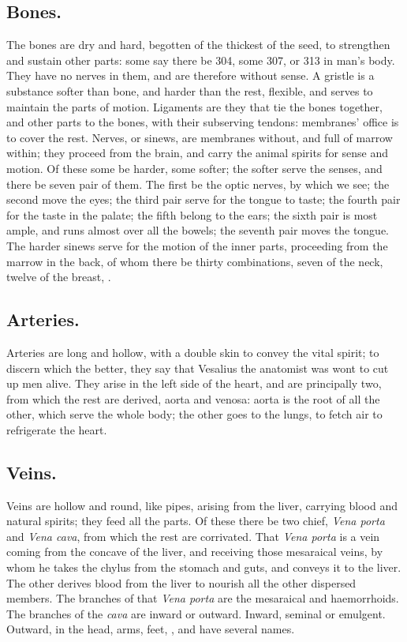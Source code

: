 {\subsection{Bones.}
The bones are dry and hard, begotten of the thickest of the
seed, to strengthen and sustain other parts: some say there be 304,
some 307, or 313 in man's body. They have no nerves in them, and are
therefore without sense.
A gristle is a substance softer than bone, and harder than the rest,
flexible, and serves to maintain the parts of motion.
Ligaments are they that tie the bones together, and other parts to the
bones, with their subserving tendons: membranes' office is to cover the
rest.
Nerves, or sinews, are membranes without, and full of marrow within;
they proceed from the brain, and carry the animal spirits for sense and
motion. Of these some be harder, some softer; the softer serve the
senses, and there be seven pair of them. The first be the optic nerves,
by which we see; the second move the eyes; the third pair serve for the
tongue to taste; the fourth pair for the taste in the palate; the fifth
belong to the ears; the sixth pair is most ample, and runs almost over
all the bowels; the seventh pair moves the tongue. The harder sinews
serve for the motion of the inner parts, proceeding from the marrow in
the back, of whom there be thirty combinations, seven of the neck,
twelve of the breast, \etc{}.
\subsection{Arteries.}
Arteries are long and hollow, with a double skin to convey
the vital spirit; to discern which the better, they say that Vesalius
the anatomist was wont to cut up men alive. They arise in the left
side of the heart, and are principally two, from which the rest are
derived, aorta and venosa: aorta is the root of all the other, which
serve the whole body; the other goes to the lungs, to fetch air to
refrigerate the heart.
\subsection{Veins.}
Veins are hollow and round, like pipes, arising from the
liver, carrying blood and natural spirits; they feed all the parts. Of
these there be two chief, \emph{Vena porta} and \emph{Vena cava}, from which the
rest are corrivated. That \emph{Vena porta} is a vein coming from the
concave of the liver, and receiving those mesaraical veins, by whom he
takes the chylus from the stomach and guts, and conveys it to the
liver. The other derives blood from the liver to nourish all the other
dispersed members. The branches of that \emph{Vena porta} are the mesaraical
and haemorrhoids. The branches of the \emph{cava} are inward or outward.
Inward, seminal or emulgent. Outward, in the head, arms, feet, \etc{}, and
have several names.
}
